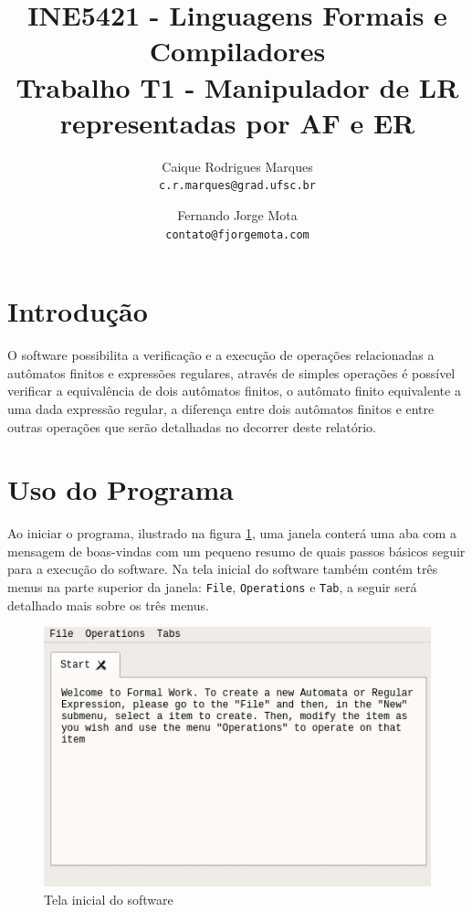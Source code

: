 \documentclass{article}
\title{\textbf{INE5421 - Linguagens Formais e Compiladores \\
        \large Trabalho T1 - Manipulador de LR representadas por AF e ER}}
\author{
    Caique Rodrigues Marques \\
    {\texttt{c.r.marques@grad.ufsc.br}}
    \and
    Fernando Jorge Mota \\
    {\texttt{contato@fjorgemota.com}}
    \vspace{-5mm}
}
\date{}
\begin{document}
\maketitle

\section{Introdução}
    O software possibilita a verificação e a execução de operações relacionadas
    a autômatos finitos e expressões regulares, através de simples operações é
    possível verificar a equivalência de dois autômatos finitos, o autômato
    finito equivalente a uma dada expressão regular, a diferença entre dois
    autômatos finitos e entre outras operações que serão detalhadas no decorrer
    deste relatório.

\section{Uso do Programa}
\label{sec:uso}
    Ao iniciar o programa, ilustrado na figura \ref{fig:start_point}, uma
    janela conterá uma aba com a mensagem de boas-vindas com um pequeno resumo
    de quais passos básicos seguir para a execução do software. Na tela inicial
    do software também contém três menus na parte superior da janela:
    \texttt{File}, \texttt{Operations} e \texttt{Tab}, a seguir será detalhado
    mais sobre os três menus.

    \begin{figure}[htp]
        \centering
        \includegraphics[width=.7\linewidth]{print_program.jpg}
        \caption{Tela inicial do software}
        \label{fig:start_point}
    \end{figure}
\end{document}

